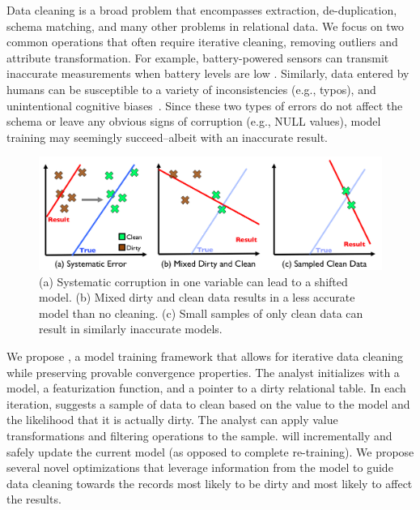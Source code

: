 Data cleaning is a broad problem that encompasses extraction, de-duplication, schema matching, and many other problems in relational data.
We focus on two common operations that often require iterative cleaning, removing outliers and attribute transformation.
For example, battery-powered sensors can transmit inaccurate measurements when battery levels are low \cite{DBLP:conf/pervasive/JefferyAFHW06}. 
Similarly, data entered by humans can be susceptible to a variety of inconsistencies (e.g., typos), and unintentional cognitive biases~\cite{DBLP:conf/recsys/KrishnanPFG14}.
Since these two types of errors do not affect the schema or leave any obvious signs of corruption (e.g., NULL values), model training may seemingly succeed--albeit with an inaccurate result.

\begin{figure}[t]
\centering
 \includegraphics[width=\columnwidth]{figs/update-arch.png}
 \caption{(a) Systematic corruption in one variable can lead to a shifted model. 
 (b) Mixed dirty and clean data results in a less accurate model than no cleaning.
(c) Small samples of only clean data can result in similarly inaccurate models. \label{update-arch1}}
\vspace{-2em}
\end{figure}

We propose \sys, a model training framework that allows for iterative data cleaning while preserving provable convergence properties.
The analyst initializes \sys with a model, a featurization function, and a pointer to a dirty relational table.
In each iteration, \sys suggests a sample of data to clean based on the value to the model and the likelihood that it is actually dirty.
The analyst can apply value transformations and filtering operations to the sample. 
\sys will incrementally and safely update the current model (as opposed to complete re-training).
We propose several novel optimizations that leverage information from the model to guide data cleaning towards the records most likely to be dirty and most likely to affect the results.

